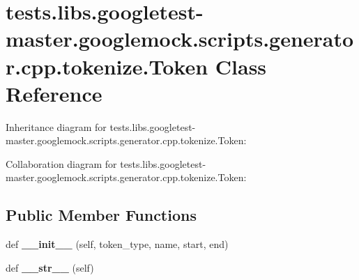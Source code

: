 \hypertarget{classtests_1_1libs_1_1googletest-master_1_1googlemock_1_1scripts_1_1generator_1_1cpp_1_1tokenize_1_1Token}{}\section{tests.\+libs.\+googletest-\/master.googlemock.\+scripts.\+generator.\+cpp.\+tokenize.\+Token Class Reference}
\label{classtests_1_1libs_1_1googletest-master_1_1googlemock_1_1scripts_1_1generator_1_1cpp_1_1tokenize_1_1Token}


Inheritance diagram for tests.\+libs.\+googletest-\/master.googlemock.\+scripts.\+generator.\+cpp.\+tokenize.\+Token\+:


Collaboration diagram for tests.\+libs.\+googletest-\/master.googlemock.\+scripts.\+generator.\+cpp.\+tokenize.\+Token\+:
\subsection*{Public Member Functions}
\begin{DoxyCompactItemize}
\item 
\mbox{\label{classtests_1_1libs_1_1googletest-master_1_1googlemock_1_1scripts_1_1generator_1_1cpp_1_1tokenize_1_1Token_a68826408835716138c17ededcd6ffaa1}} 
def {\bfseries \+\_\+\+\_\+init\+\_\+\+\_\+} (self, token\+\_\+type, name, start, end)
\item 
\mbox{\label{classtests_1_1libs_1_1googletest-master_1_1googlemock_1_1scripts_1_1generator_1_1cpp_1_1tokenize_1_1Token_a3a7875c8f729476921be8294512ca9ed}} 
def {\bfseries \+\_\+\+\_\+str\+\_\+\+\_\+} (self)
\end{DoxyCompactItemize}
